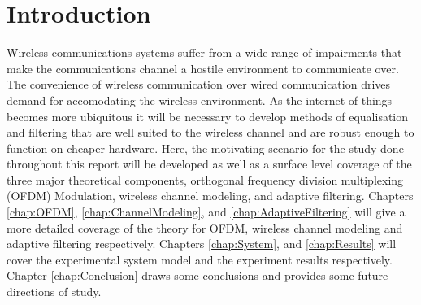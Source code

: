\chapter{Introduction}
\label{ch:Introduction}
Wireless communications systems suffer from a wide %
range of impairments that make the communications %
channel a hostile environment to communicate over. %
The convenience of wireless communication over %
wired communication drives demand for accomodating %
the wireless environment. %
As the internet of things becomes more ubiquitous %
it will be necessary to develop methods of %
equalisation and filtering that are well suited to the %
wireless channel and are robust enough to function %
on cheaper hardware. Here, the motivating %
scenario for the study done throughout this %
report will be developed as well as a surface level %
coverage of the three major theoretical components, %
orthogonal frequency division multiplexing (OFDM) %
Modulation, wireless channel modeling, and %
adaptive filtering. Chapters \ref{chap:OFDM}, %
\ref{chap:ChannelModeling}, and %
\ref{chap:AdaptiveFiltering} will give a more detailed %
coverage of the theory for OFDM, wireless channel %
modeling and adaptive filtering respectively. Chapters %
\ref{chap:System}, and \ref{chap:Results} will cover %
the experimental system model and the experiment %
results respectively. Chapter \ref{chap:Conclusion} %
draws some conclusions and provides some future %
directions of study.


